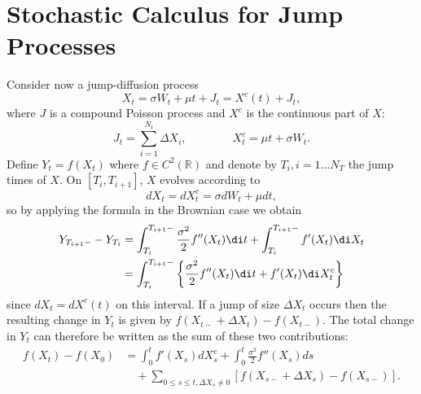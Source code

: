 \section{Stochastic Calculus for Jump Processes}

Consider now a jump-diffusion process
\begin{equation} \label{eq:JumpDiffusionProcess}
	X_t = \sigma W_t + \mu t + J_t = X^c(t) + J_t,
\end{equation}
where $J$ is a compound Poisson process and $X^c$ is the continuous part of $X$:
\begin{equation} \label{eq:ComponentDefinitions}
	J_t = \sum_{i=1}^{N_t} \Delta X_i, \qquad\qquad X^c_t = \mu t + \sigma W_t.
\end{equation}
Define $Y_t = f(X_t)$ where $f \in C^2(\mathbb{R})$ and denote by $T_i, i = 1 \dots N_T$ the jump times of $X$. On $[T_i, T_{i+1}]$, $X$ evolves according to
\begin{equation} \label{eq:EvolutionBetweenJumps}
	dX_t = dX^c_t = \sigma dW_t + \mu dt,
\end{equation}
so by applying the \Ito{} formula in the Brownian case we obtain
\begin{align} \label{eq:ItoIntegration}
	Y_{T_{i+1}-} - Y_{T_i} & = \int_{T_i}^{T_{i+1}-} \frac{\sigma^2}{2} f''(X_t) \di t + \int_{T_i}^{T_{i+1}-} f'(X_t) \di X_t \nonumber \\
	                       & = \int_{T_i}^{T_{i+1}-} \left\{ \frac{\sigma^2}{2} f''(X_t) \di t + f'(X_t) \di X^c_t \right\}
\end{align}
since $dX_t = dX^c(t)$ on this interval. If a jump of size $\Delta X_t$ occurs then the resulting change in $Y_t$ is given by $f(X_{t-} + \Delta X_t) - f(X_{t-})$. The total change in $Y_t$ can therefore be written as the sum of these two contributions:
\begin{equation} \label{eq:FinalItoFormula}
	\begin{split}
		f(X_t) - f(X_0) & = \int_0^t f'(X_s) dX^c_s + \int_0^t \frac{\sigma^2}{2} f''(X_s) ds                   \\
		                & \quad + \sum_{0 \le s \le t, \Delta X_s \neq 0} [f(X_{s-} + \Delta X_s) - f(X_{s-})].
	\end{split}
\end{equation}

